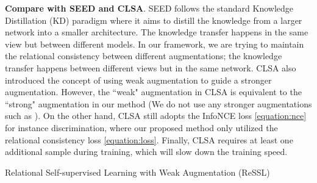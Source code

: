 \documentclass{article}
\newcommand{\<}{\left\langle}
\renewcommand{\>}{\right\rangle}
\begin{document}
\textbf{Compare with SEED and CLSA}. SEED \cite{seed} follows the standard Knowledge Distillation (KD) paradigm \cite{hinton2015distilling,romero2014fitnets,you2017learning} where it aims to distill the knowledge from a larger network into a smaller architecture. The knowledge transfer happens in the same view but between different models. In our framework, we are trying to maintain the relational consistency between different augmentations; the knowledge transfer happens between different views but in the same network. CLSA \cite{stronger} also introduced the concept of using weak augmentation to guide a stronger augmentation. However, the ``weak" augmentation in CLSA is equivalent to the ``strong" augmentation in our method (We do not use any stronger augmentations such as \cite{autoaugment, randaugment}). On the other hand, CLSA still adopts the InfoNCE loss \eqref{equation:nce} for instance discrimination, where our proposed method only utilized the relational consistency loss \eqref{equation:loss}. Finally, CLSA requires at least one additional sample during training, which will slow down the training speed.


\begin{algorithm}
\SetAlgoLined
{}
 {
}
\caption{Relational Self-supervised Learning with Weak Augmentation (ReSSL)}
\label{alg:overall}
\end{algorithm}
\end{document}
